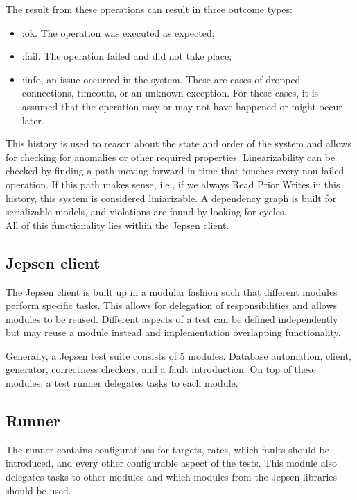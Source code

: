 \documentclass[a4paper,10pt,titlepage]{report}
\begin{document}

\vspace{25mm}
The result from these operations can result in three outcome types:
\begin{itemize}
\item :ok. The operation was executed as expected;
\item :fail. The operation failed and did not take place;
\item :info, an issue occurred in the system. These are cases of dropped connections, timeouts, or an unknown exception. For these cases, it is assumed that the operation may or may not have happened or might occur later.
\end{itemize}
This history is used to reason about the state and order of the system and allows for checking for anomalies or other required properties. Linearizability can be checked by finding a path moving forward in time that touches every non-failed operation. If this path makes sense, i.e., if we always Read Prior Writes in this history, this system is considered liniarizable. A dependency graph is built for serializable models, and violations are found by looking for cycles. \\

All of this functionality lies within the Jepsen client.

\subsection{Jepsen client}
The Jepsen client is built up in a modular fashion such that different modules perform specific tasks. This allows for delegation of responsibilities and allows modules to be reused. Different aspects of a test can be defined independently but may reuse a module instead and implementation overlapping functionality.

Generally, a Jepsen test suite consists of 5 modules. Database automation, client, generator, correctness checkers, and a fault introduction. On top of these modules, a test runner delegates tasks to each module.

\subsection{Runner}

The runner contains configurations for targets, rates, which faults should be introduced, and every other configurable aspect of the tests. This module also delegates tasks to other modules and which modules from the Jepsen libraries should be used. 
\end{document}
